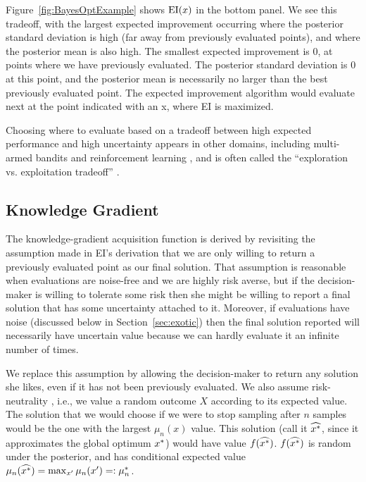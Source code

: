 \documentclass{article}
\begin{document}
Figure~\ref{fig:BayesOptExample} shows $\mathrm{EI}(x)$ in the bottom panel.  We see this tradeoff, with the largest expected improvement occurring where the posterior standard deviation is high (far away from previously evaluated points), and where the posterior mean is also high.  The smallest expected improvement is $0$, at points where we have previously evaluated.  The posterior standard deviation is $0$ at this point, and the posterior mean is necessarily no larger than the best previously evaluated point.  The expected improvement algorithm would evaluate next at the point indicated with an x, where EI is maximized.

Choosing where to evaluate based on a tradeoff between high expected performance and high uncertainty appears in other domains, including multi-armed bandits \cite{mahajan2008multi} and reinforcement learning \cite{sutton1998reinforcement}, and is often called the ``exploration vs. exploitation tradeoff'' \citep{kaelbling1996reinforcement}.



\subsection{Knowledge Gradient}
\label{sec:KG}

The knowledge-gradient acquisition function is derived by revisiting the assumption made in EI's derivation that we are only willing to return a previously evaluated point as our final solution.  That assumption is reasonable when evaluations are noise-free and we are highly risk averse, but if the decision-maker is willing to tolerate some risk then she might be willing to report a final solution that has some uncertainty attached to it.  Moreover, if evaluations have noise (discussed below in Section~\ref{sec:exotic}) then the final solution reported will necessarily have uncertain value because we can hardly evaluate it an infinite number of times. 

We replace this assumption by allowing the decision-maker to return any solution she likes, even if it has not been previously evaluated.
We also assume risk-neutrality \citep{berger2013statistical}, i.e., we value a random outcome $X$ according to its expected value.  
The solution that we would choose if we were to stop sampling after $n$ samples would be the one with the largest $\mu_n(x)$ value.  This solution (call it $\widehat{x^*}$, since it approximates the global optimum $x^*$) would have value $f(\widehat{x^*})$.  $f(\widehat{x^*})$ is random under the posterior, and has conditional expected value $\mu_n(\widehat{x^*}) = \max_{x'} \mu_n(x') =: \mu^*_n$.
\end{document}
